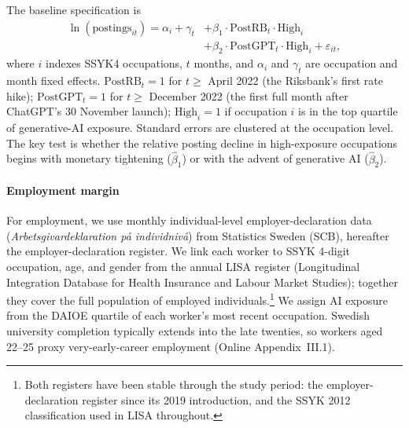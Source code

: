\documentclass[preprint,12pt,authoryear]{elsarticle}
\begin{document}
The baseline specification is
\begin{equation}\label{eq:did}
\begin{split}
\ln(\text{postings}_{it}) = \alpha_i + \gamma_t &+ \beta_1 \cdot \text{PostRB}_t \cdot \text{High}_i \\
&+ \beta_2 \cdot \text{PostGPT}_t \cdot \text{High}_i + \varepsilon_{it},
\end{split}
\end{equation}
where $i$ indexes SSYK4 occupations, $t$ months, and $\alpha_i$ and $\gamma_t$ are occupation and month fixed effects. $\text{PostRB}_t = 1$ for $t \geq$ April 2022 (the Riksbank's first rate hike); $\text{PostGPT}_t = 1$ for $t \geq$ December 2022 (the first full month after ChatGPT's 30 November launch); $\text{High}_i = 1$ if occupation $i$ is in the top quartile of generative-AI exposure. Standard errors are clustered at the occupation level. The key test is whether the relative posting decline in high-exposure occupations begins with monetary tightening ($\hat\beta_1$) or with the advent of generative AI ($\hat\beta_2$).

\paragraph{Employment margin} {\sloppy For employment, we use monthly individual-level employer-declaration data (\emph{Arbetsgivardeklaration på individnivå}) from Statistics Sweden (SCB), hereafter the employer-declaration register. We link each worker to SSYK 4-digit occupation, age, and gender from the annual LISA register (Longitudinal Integration Database for Health Insurance and Labour Market Studies); together they cover the full population of employed individuals.\footnote{Both registers have been stable through the study period: the employer-declaration register since its 2019 introduction, and the SSYK 2012 classification used in LISA throughout.} We assign AI exposure from the DAIOE quartile of each worker's most recent occupation. Swedish university completion typically extends into the late twenties, so workers aged 22--25 proxy very-early-career employment (Online Appendix~III.1).\par}
\end{document}
